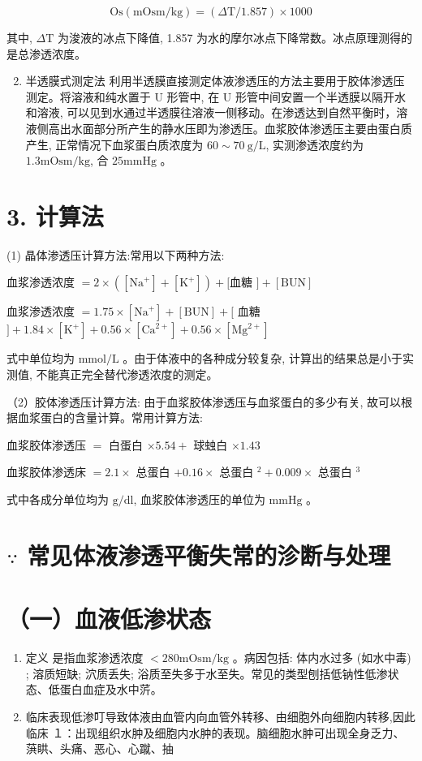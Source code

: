 \documentclass[10pt]{article}
\begin{document}
\[
\mathrm{Os}(\mathrm{mOsm} / \mathrm{kg})=(\Delta \mathrm{T} / 1.857) \times 1000
\]

其中, $\Delta \mathrm{T}$ 为浚液的冰点下降值, 1.857 为水的摩尔冰点下降常数。冰点原理测得的是总渗透浓度。

\begin{enumerate}
  \setcounter{enumi}{1}
  \item 半透膜式测定法 利用半透膜直接测定体液渗透压的方法主要用于胶体渗透压测定。将溶液和纯水置于 U 形管中, 在 U 形管中间安置一个半透膜以隔开水和溶液, 可以见到水通过半透膜往溶液一侧移动。在渗透达到自然平衡时，溶液侧高出水面部分所产生的静水压即为渗透压。血浆胶体渗透压主要由蛋白质产生, 正常情况下血浆蛋白质浓度为 $60 \sim 70 \mathrm{~g} / \mathrm{L}$, 实测渗透浓度约为 $1.3 \mathrm{mOsm} / \mathrm{kg}$, 合 $25 \mathrm{mmHg}$ 。
\end{enumerate}

\section*{3. 计算法}
(1) 晶体渗透压计算方法:常用以下两种方法:

血浆渗透浓度 $=2 \times\left(\left[\mathrm{Na}^{+}\right]+\left[\mathrm{K}^{+}\right]\right)+[$血糖 $]+[\mathrm{BUN}]$

血浆渗透浓度 $=1.75 \times\left[\mathrm{Na}^{+}\right]+[\mathrm{BUN}]+[$ 血糖 $]+1.84 \times\left[\mathrm{K}^{+}\right]+0.56 \times\left[\mathrm{Ca}^{2+}\right]+0.56 \times\left[\mathrm{Mg}^{2+}\right]$

式中单位均为 $\mathrm{mmol} / \mathrm{L}$ 。由于体液中的各种成分较复杂, 计算出的结果总是小于实测值, 不能真正完全替代渗透浓度的测定。

（2）胶体渗透压计算方法: 由于血浆胶体渗透压与血浆蛋白的多少有关, 故可以根据血浆蛋白的含量计算。常用计算方法:

血浆胶体渗透压 $=$ 白蛋白 $\times 5.54+$ 球䖵白 $\times 1.43$

血浆胶体渗透床 $=2.1 \times$ 总蛋白 $+0.16 \times$ 总蛋白 ${ }^{2}+0.009 \times$ 总蛋白 ${ }^{3}$

式中各成分单位均为 $\mathrm{g} / \mathrm{dl}$, 血浆胶体渗透压的单位为 $\mathrm{mmHg}$ 。

\section*{$\because$ 常见体液渗透平衡失常的沴断与处理}
\section*{（一）血液低渗状态}
\begin{enumerate}
  \item 定义 是指血浆渗透浓度 $<280 \mathrm{mO} \mathrm{sm} / \mathrm{kg}$ 。病因包括: 体内水过多 (如水中毒) ; 溶质短缺; 泬质丢失; 浴质至失多于水至失。常见的类型刨括低钠性低渗状态、低蛋白血症及水中䓅。

  \item 临床表现低渗叮导致体液由血管内向血管外转移、由细胞外向细胞内转移,因此临床 １：出现组织水肿及细胞内水肿的表现。脑细胞水肿可出现全身乏力、葓䀧、头痛、恶心、心蹴、抽

\end{enumerate}
\end{document}

